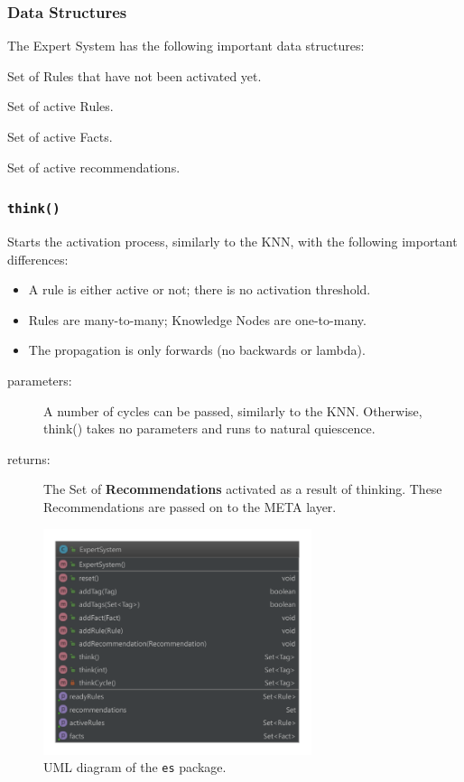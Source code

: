 \documentclass{beamer}
\newcommand{\code}[1]{\texttt{#1}}
\begin{document}
	\begin{frame}
		\frametitle{Data Structures}
		The Expert System has the following important data structures:
		\begin{description}[\code{recommendations}]
			\item[\code{readyRules}] Set of Rules that have not been activated yet.
			\item[\code{activeRules}] Set of active Rules.
			\item[\code{facts}] Set of active Facts.
			\item[\code{recommendations}] Set of active recommendations.
		\end{description}
	\end{frame}

	\begin{frame}
		\frametitle{\code{think()}}
		Starts the activation process, similarly to the KNN, with the following important differences:
		\begin{itemize}
			\item A rule is either active or not; there is no activation threshold.
			\item Rules are many-to-many; Knowledge Nodes are one-to-many.
			\item The propagation is only forwards (no backwards or lambda).
		\end{itemize}
	
		\begin{description}
			\item[parameters:] A number of cycles can be passed, similarly to the KNN. Otherwise, think() takes no parameters and runs to natural quiescence.
			\item[returns:] The Set of \textbf{Recommendations} activated as a result of thinking. These Recommendations are passed on to the META layer.
		\end{description}
		
	\end{frame}

	\begin{frame}
		\begin{figure}
			\centering
			\includegraphics[width=0.7\textwidth]{figures/uml_es.pdf}
			\caption
			{UML diagram of the \code{es} package.}
			\label{fig:uml_es}
		\end{figure}
	\end{frame}
\end{document}
